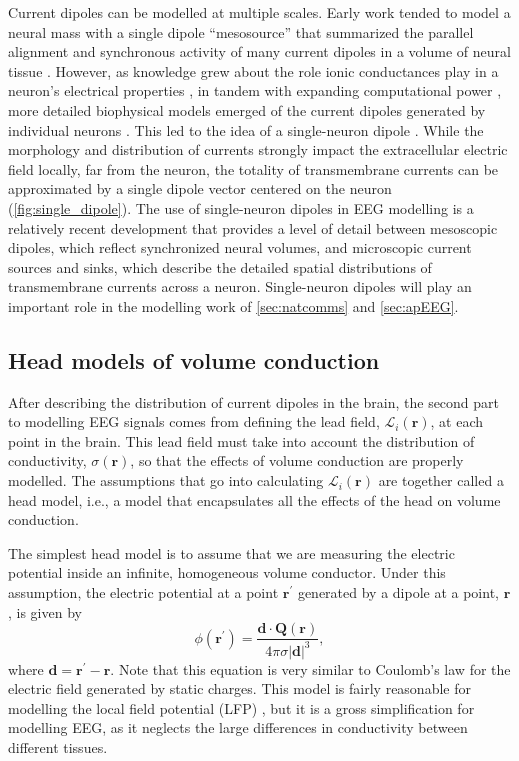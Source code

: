Current dipoles can be modelled at multiple scales. Early work tended to model a neural mass with a single dipole ``mesosource'' that summarized the parallel alignment and synchronous activity of many current dipoles in a volume of neural tissue \cite{Nunez2006}. However, as knowledge grew about the role ionic conductances play in a neuron's electrical properties \cite{Baxter1991}, in tandem with expanding computational power \cite{Beeman2013}, more detailed biophysical models emerged of the current dipoles generated by individual neurons \cite{Murakami2002, Murakami2003 ,Murakami2006, Jones2007}. This led to the idea of a single-neuron dipole \cite{Næss2021,Pettersen2012}. While the morphology and distribution of currents strongly impact the extracellular electric field locally, far from the neuron, the totality of transmembrane currents can be approximated by a single dipole vector centered on the neuron (\autoref{fig:single_dipole}). The use of single-neuron dipoles in EEG modelling is a relatively recent development that provides a level of detail between mesoscopic dipoles, which reflect synchronized neural volumes, and microscopic current sources and sinks, which describe the detailed spatial distributions of transmembrane currents across a neuron. Single-neuron dipoles will play an important role in the modelling work of \autoref{sec:natcomms} and \autoref{sec:apEEG}.

\subsection{Head models of volume conduction} \label{sec:head_models}
After describing the distribution of current dipoles in the brain, the second part to modelling EEG signals comes from defining the lead field, $\mathcal{L}_i(\bm{r})$, at each point in the brain. This lead field must take into account the distribution of conductivity, $\sigma(\bm{r})$, so that the effects of volume conduction are properly modelled. The assumptions that go into calculating $\mathcal{L}_i(\bm{r})$ are together called a head model, i.e., a model that encapsulates all the effects of the head on volume conduction.

The simplest head model is to assume that we are measuring the electric potential inside an infinite, homogeneous volume conductor. Under this assumption, the electric potential at a point $\bm{r}^\prime$ generated by a dipole at a point, $\bm{r}$, is given by
\begin{equation}
    \phi(\bm{r}^\prime) = \frac{\bm{d} \cdot \bm{Q}(\bm{r})}{4\pi\sigma |\bm{d}|^3}\mathrm{,}
\end{equation}
where $\bm{d}=\bm{r}^\prime-\bm{r}$. Note that this equation is very similar to Coulomb's law for the electric field generated by static charges. This model is fairly reasonable for modelling the local field potential (LFP) \cite{Pettersen2012}, but it is a gross simplification for modelling EEG, as it neglects the large differences in conductivity between different tissues.


